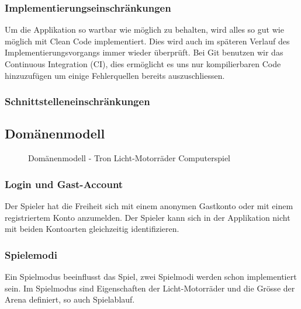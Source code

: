 \documentclass[11pt,ngerman]{article}
\begin{document}
    \subsubsection{Implementierungseinschränkungen}
    Um die Applikation so wartbar wie möglich zu behalten, wird alles so gut wie möglich mit Clean Code implementiert. Dies wird auch im späteren Verlauf des Implementierungsvorgangs immer wieder überprüft. Bei Git benutzen wir das \Gls{Continuous Integration} (CI), dies ermöglicht es uns nur kompilierbaren Code hinzuzufügen um einige Fehlerquellen bereits auszuschliessen.
    \subsubsection{Schnittstelleneinschränkungen}

    \subsection{Domänenmodell}
    \begin{figure}[H]
    	\centering
    	\caption{Domänenmodell - Tron Licht-Motorräder Computerspiel}
    	\label{fig:DomainModel_TronLightCycles}
    \end{figure}
    \subsubsection{Login und Gast-Account}
    Der Spieler hat die Freiheit sich mit einem anonymen Gastkonto  oder mit einem registriertem Konto anzumelden. Der Spieler kann sich in der Applikation nicht mit beiden Kontoarten gleichzeitig identifizieren.

    \subsubsection{Spielemodi}
    Ein Spielmodus beeinflusst das Spiel, zwei Spielmodi werden schon implementiert sein. Im Spielmodus sind Eigenschaften der Licht-Motorräder und die Grösse der Arena definiert, so auch Spielablauf.
\end{document}
